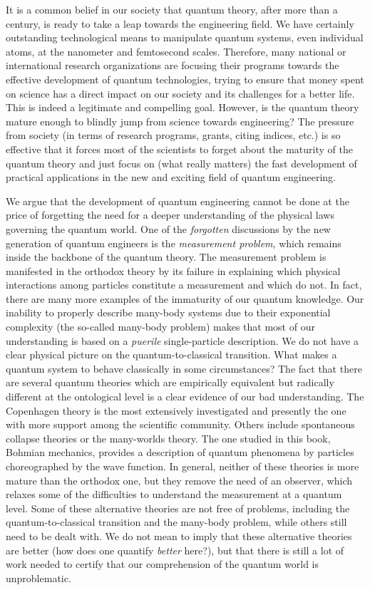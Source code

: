 \documentclass[nofootinbib, secnumarabic, amsmath, nobibnotes,11pt,aps,pra, floatfix]{revtex4-1}
\begin{document}
It is a common belief in our society that quantum theory, after more than a century, is ready to take a leap towards the engineering field. We have certainly outstanding technological means to manipulate quantum systems, even individual atoms, at the nanometer and femtosecond scales. Therefore, many national or international research organizations are focusing their programs towards the effective development of quantum technologies, trying to ensure that money spent on science has a direct impact on our society and its challenges for a better life. This is indeed a legitimate and compelling goal. However, is the quantum theory mature enough to blindly jump from science towards engineering? The pressure from society (in terms of research programs, grants, citing indices, etc.) is so effective that it forces most of the scientists to forget about the maturity of the quantum theory and just focus on (what really matters) the fast development of practical applications in the new and exciting field of quantum engineering.

We argue that the development of quantum engineering cannot be done at the price of forgetting the need for a deeper understanding of the physical laws governing the quantum world. One of the \emph{forgotten} discussions by the new generation of quantum engineers is the \emph{measurement problem}, which remains inside the backbone of the quantum theory. The measurement problem is manifested in the orthodox theory by its failure in explaining which physical interactions among particles constitute a measurement and which do not. In fact, there are many more examples of the immaturity of our quantum knowledge. Our inability to properly describe many-body systems due to their exponential complexity (the so-called many-body problem) makes that most of our understanding is based on a \emph{puerile} single-particle description. We do not have a clear physical picture on the quantum-to-classical transition. What makes a quantum system to behave classically in some circumstances? The fact that there are several quantum theories which are empirically equivalent but radically different at the ontological level is a clear evidence of our bad understanding. The Copenhagen theory is the most extensively investigated and presently the one with more support among the scientific community. Others include spontaneous collapse theories or the many-worlds theory. The one studied in this book, Bohmian mechanics, provides a description of quantum phenomena by particles choreographed by the wave function. In general, neither of these theories is more mature than the orthodox one, but they remove the need of an observer, which relaxes some of the difficulties to understand the measurement at a quantum level. Some of these alternative theories are not free of problems, including the quantum-to-classical transition and the many-body problem, while others still need to be dealt with. We do not mean to imply that these alternative theories are better (how does one quantify \emph{better} here?), but that there is still a lot of work needed to certify that our comprehension of the quantum world is unproblematic. 
\end{document}
